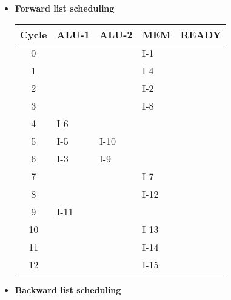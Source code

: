 \begin{itemize}
\item \textbf{Forward list scheduling}

\begin{table}[!ht]
\centering
\begin{tabular}{c|l|l|l|l}
  \toprule
  \toprule
  \textbf{Cycle} & \textbf{ALU-1} & \textbf{ALU-2} & \textbf{MEM} & \textbf{READY} \\
  \midrule
  0  &      &      &  I-1  &       \\ \hline
  1  &      &      &  I-4  &       \\ \hline
  2  &      &      &  I-2  &       \\ \hline
  3  &      &      &  I-8  &       \\ \hline
  4  & I-6  &      &       &       \\ \hline
  5  & I-5  & I-10 &       &       \\ \hline
  6  & I-3  & I-9  &       &       \\ \hline
  7  &      &      &  I-7  &       \\ \hline
  8  &      &      &  I-12 &       \\ \hline
  9  & I-11 &      &       &       \\ \hline
  10 &      &      &  I-13 &       \\ \hline
  11 &      &      &  I-14 &       \\ \hline
  12 &      &      &  I-15 &       \\ \hline
  \bottomrule
\end{tabular}
\end{table}

\item \textbf{Backward list scheduling}

\end{itemize}

